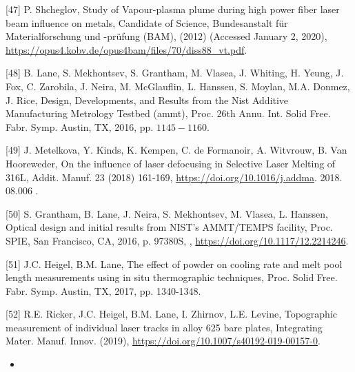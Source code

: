 \documentclass[10pt]{article}
\begin{document}
[47] P. Shcheglov, Study of Vapour-plasma plume during high power fiber laser beam influence on metals, Candidate of Science, Bundesanstalt für Materialforschung und -prüfung (BAM), (2012) (Accessed January 2, 2020), \href{https://opus4.kobv.de/opus4bam/files/70/diss88_vt.pdf}{https://opus4.kobv.de/opus4bam/files/70/diss88\_vt.pdf}.

[48] B. Lane, S. Mekhontsev, S. Grantham, M. Vlasea, J. Whiting, H. Yeung, J. Fox, C. Zarobila, J. Neira, M. McGlauflin, L. Hanssen, S. Moylan, M.A. Donmez, J. Rice, Design, Developments, and Results from the Nist Additive Manufacturing Metrology Testbed (ammt), Proc. 26th Annu. Int. Solid Free. Fabr. Symp. Austin, TX, 2016, pp. $1145-1160$.

[49] J. Metelkova, Y. Kinds, K. Kempen, C. de Formanoir, A. Witvrouw, B. Van Hooreweder, On the influence of laser defocusing in Selective Laser Melting of 316L, Addit. Manuf. 23 (2018) 161-169, \href{https://doi.org/10.1016/j.addma}{https://doi.org/10.1016/j.addma}. 2018. 08.006 .

[50] S. Grantham, B. Lane, J. Neira, S. Mekhontsev, M. Vlasea, L. Hanssen, Optical design and initial results from NIST's AMMT/TEMPS facility, Proc. SPIE, San Francisco, CA, 2016, p. 97380S, , \href{https://doi.org/10.1117/12.2214246}{https://doi.org/10.1117/12.2214246}.

[51] J.C. Heigel, B.M. Lane, The effect of powder on cooling rate and melt pool length measurements using in situ thermographic techniques, Proc. Solid Free. Fabr. Symp. Austin, TX, 2017, pp. 1340-1348.

[52] R.E. Ricker, J.C. Heigel, B.M. Lane, I. Zhirnov, L.E. Levine, Topographic measurement of individual laser tracks in alloy 625 bare plates, Integrating Mater. Manuf. Innov. (2019), \href{https://doi.org/10.1007/s40192-019-00157-0}{https://doi.org/10.1007/s40192-019-00157-0}.

\begin{itemize}
  \item 
\end{itemize}
\end{document}
